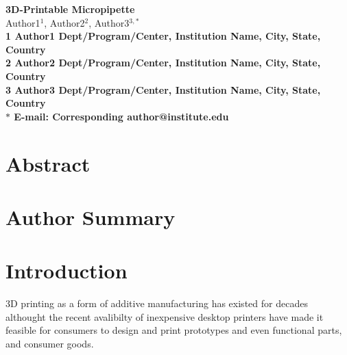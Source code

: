 \pagestyle{myheadings}







\begin{flushleft}
{\Large
\textbf{3D-Printable Micropipette}
}
\\
Author1$^{1}$, 
Author2$^{2}$, 
Author3$^{3,\ast}$
\\
\bf{1} Author1 Dept/Program/Center, Institution Name, City, State, Country
\\
\bf{2} Author2 Dept/Program/Center, Institution Name, City, State, Country
\\
\bf{3} Author3 Dept/Program/Center, Institution Name, City, State, Country
\\
$\ast$ E-mail: Corresponding author@institute.edu
\end{flushleft}

\section*{Abstract}

\section*{Author Summary}



\section*{Introduction}

3D printing as a form of additive manufacturing has existed for decades althought the recent avalibilty of inexpensive desktop printers have made it feasible for consumers to design and print prototypes and even functional parts, and consumer goods.

